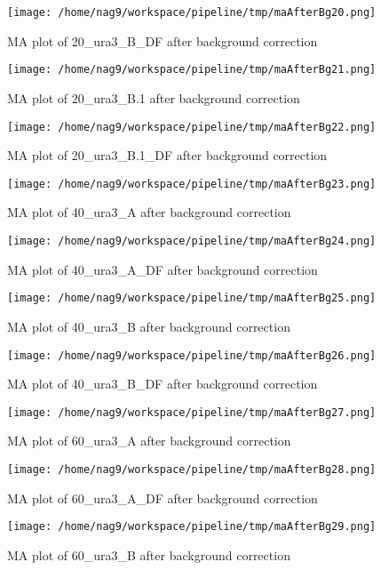 \documentclass[titlepage]{article}
\begin{document}
\begin{figure}[htb!]
\centering
\texttt{[image: /home/nag9/workspace/pipeline/tmp/maAfterBg20.png]}
\caption{MA plot of 20\_ura3\_B\_DF after background correction}
\end{figure}\pagebreak
\begin{figure}[htb!]
\centering
\texttt{[image: /home/nag9/workspace/pipeline/tmp/maAfterBg21.png]}
\caption{MA plot of 20\_ura3\_B.1 after background correction}
\end{figure}\pagebreak
\begin{figure}[htb!]
\centering
\texttt{[image: /home/nag9/workspace/pipeline/tmp/maAfterBg22.png]}
\caption{MA plot of 20\_ura3\_B.1\_DF after background correction}
\end{figure}\pagebreak
\begin{figure}[htb!]
\centering
\texttt{[image: /home/nag9/workspace/pipeline/tmp/maAfterBg23.png]}
\caption{MA plot of 40\_ura3\_A after background correction}
\end{figure}\pagebreak
\begin{figure}[htb!]
\centering
\texttt{[image: /home/nag9/workspace/pipeline/tmp/maAfterBg24.png]}
\caption{MA plot of 40\_ura3\_A\_DF after background correction}
\end{figure}\pagebreak
\begin{figure}[htb!]
\centering
\texttt{[image: /home/nag9/workspace/pipeline/tmp/maAfterBg25.png]}
\caption{MA plot of 40\_ura3\_B after background correction}
\end{figure}\pagebreak
\begin{figure}[htb!]
\centering
\texttt{[image: /home/nag9/workspace/pipeline/tmp/maAfterBg26.png]}
\caption{MA plot of 40\_ura3\_B\_DF after background correction}
\end{figure}\pagebreak
\begin{figure}[htb!]
\centering
\texttt{[image: /home/nag9/workspace/pipeline/tmp/maAfterBg27.png]}
\caption{MA plot of 60\_ura3\_A after background correction}
\end{figure}\pagebreak
\begin{figure}[htb!]
\centering
\texttt{[image: /home/nag9/workspace/pipeline/tmp/maAfterBg28.png]}
\caption{MA plot of 60\_ura3\_A\_DF after background correction}
\end{figure}\pagebreak
\begin{figure}[htb!]
\centering
\texttt{[image: /home/nag9/workspace/pipeline/tmp/maAfterBg29.png]}
\caption{MA plot of 60\_ura3\_B after background correction}
\end{figure}\pagebreak
\end{document}

